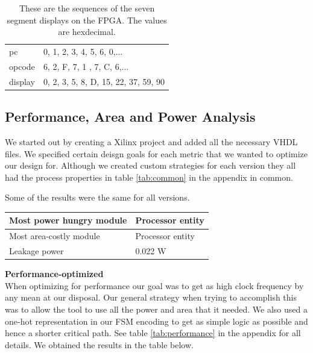 \documentclass[a4paper,11pt]{article}
\begin{document}
\begin{table}[h!]
\centering
\begin{tabular}{|l|l|} \hline
  pc & 0, 1, 2, 3, 4, 5, 6, 0,...\\
  opcode & 6, 2, F, 7, 1 , 7, C, 6,... \\
  display & 0, 2, 3, 5, 8, D, 15, 22, 37, 59, 90\\ \hline
\end{tabular}
\label{tab:sequences}
\caption{These are the sequences of the seven segment displays on the FPGA. The values are hexdecimal.}
\end{table}

\newpage
\subsection{Performance, Area and Power Analysis}

We started out by creating a Xilinx project and added all the necessary VHDL files. We specified certain deisgn goals for each metric that we wanted to optimize our design for. Although we created custom strategies for each version they all had the process properties in table \ref{tab:common} in the appendix in common.

Some of the results were the same for all versions.

\begin{table}[h!]
\centering
\begin{tabular}{|l|l|} \hline
  Most power hungry module & Processor entity \\ \hline
  Most area-costly module & Processor entity \\ \hline
  Leakage power & 0.022 W \\ \hline
\end{tabular}
\end{table}

\textbf{Performance-optimized} \\
When optimizing for performance our goal was to get as high clock frequency by any mean at our disposal. Our general strategy when trying to accomplish this was to allow the tool to use all the power and area that it needed. We also used a one-hot representation in our FSM encoding to get as simple logic as possible and hence a shorter critical path. See table \ref{tab:performance} in the appendix for all details. We obtained the results in the table below.

\end{document}
